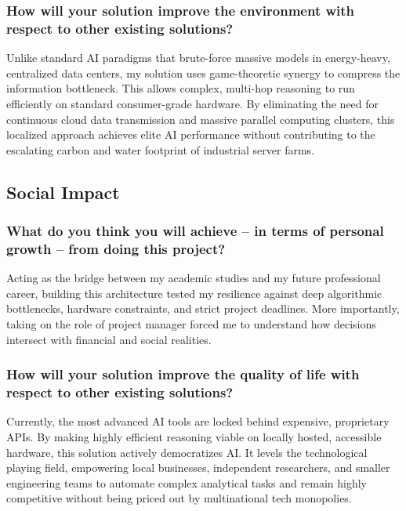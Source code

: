 \subsubsection{How will your solution improve the environment with respect to other existing solutions?}
\label{subsubsec:improve-environmental-impact}

Unlike standard AI paradigms that brute-force massive models in energy-heavy, centralized data centers, my solution uses game-theoretic synergy to compress the information bottleneck. This allows complex, multi-hop reasoning to run efficiently on standard consumer-grade hardware. By eliminating the need for continuous cloud data transmission and massive parallel computing clusters, this localized approach achieves elite AI performance without contributing to the escalating carbon and water footprint of industrial server farms.

\subsection{Social Impact}
\label{subsec:social-impact}

\subsubsection{What do you think you will achieve – in terms of personal growth – from doing this project?}
\label{subsubsec:personal-growth}

Acting as the bridge between my academic studies and my future professional career, building this architecture tested my resilience against deep algorithmic bottlenecks, hardware constraints, and strict project deadlines. More importantly, taking on the role of project manager forced me to understand how decisions intersect with financial and social realities.

\subsubsection{How will your solution improve the quality of life with respect to other existing solutions?}
\label{subsubsec:improve-quality-life}

Currently, the most advanced AI tools are locked behind expensive, proprietary APIs. By making highly efficient reasoning viable on locally hosted, accessible hardware, this solution actively democratizes AI. It levels the technological playing field, empowering local businesses, independent researchers, and smaller engineering teams to automate complex analytical tasks and remain highly competitive without being priced out by multinational tech monopolies.

